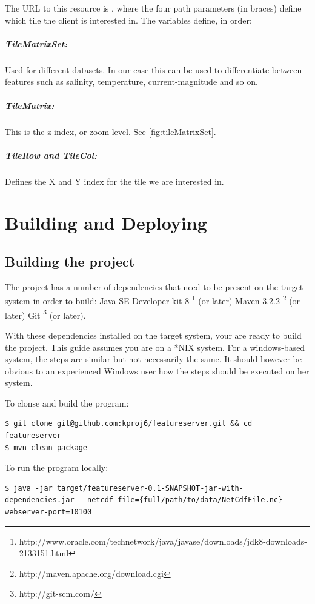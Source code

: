 \documentclass[11pt,a4paper,titlepage,oneside]{report}
\begin{document}
The URL to this resource is , where the four path parameters (in braces) define which tile the client is interested in. The variables define, in order: 
\paragraph{TileMatrixSet: }
Used for different datasets. In our case this can be used to differentiate between features such as salinity, temperature, current-magnitude and so on.
\paragraph{TileMatrix: }
This is the z index, or zoom level. See \ref{fig:tileMatrixSet}.
\paragraph{TileRow and TileCol:}
Defines the X and Y index for the tile we are interested in.

\chapter{Building and Deploying}
\section{Building the project}
The project has a number of dependencies that need to be present on the target system in order to build:
Java SE Developer kit 8 \footnote{http://www.oracle.com/technetwork/java/javase/downloads/jdk8-downloads-2133151.html} (or later)
Maven 3.2.2 \footnote{http://maven.apache.org/download.cgi} (or later)
Git \footnote{http://git-scm.com/} (or later).

With these dependencies installed on the target system, your are ready to build the project.
This guide assumes you are on a *NIX system. For a windows-based system, the steps are similar but not necessarily the same. It should however be obvious to an experienced Windows user how the steps should be executed on her system.

To clonse and build the program:
\begin{lstlisting}
$ git clone git@github.com:kproj6/featureserver.git && cd featureserver
$ mvn clean package
\end{lstlisting}

To run the program locally:
\begin{lstlisting}
$ java -jar target/featureserver-0.1-SNAPSHOT-jar-with-dependencies.jar --netcdf-file={full/path/to/data/NetCdfFile.nc} --webserver-port=10100
\end{lstlisting}
\end{document}
